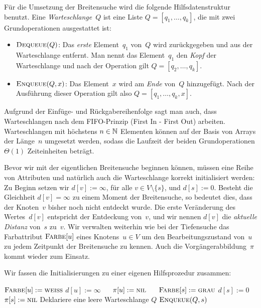 \begin{defn} 
Für die Umsetzung der Breitensuche wird die folgende Hilfsdatenstruktur benutzt.
Eine \emph{Warteschlange}~$Q$ ist eine Liste $Q=[q_1,\ldots,q_k]$, die mit zwei Grundoperationen ausgestattet ist:
\begin{itemize}
 \item $\mathop{\text{\textsc{Dequeue}}}(Q)$: Das \emph{erste} Element~$q_1$ von~$Q$ wird zurückgegeben und aus der Warteschlange entfernt.
 Man nennt das Element~$q_1$ den \emph{Kopf} der Warteschlange und nach der Operation gilt $Q=[q_2,\ldots,q_k]$.

 \item $\mathop{\text{\textsc{Enqueue}}}(Q,x)$: Das Element~$x$ wird am \emph{Ende} von~$Q$ hinzugefügt.
 Nach der Ausführung dieser Operation gilt also $Q=[q_1,\ldots,q_k,x]$. 
\end{itemize}
\end{defn} 

\begin{bem}
Aufgrund der Einfüge- und Rückgabereihenfolge sagt man auch, dass Warteschlangen nach dem FIFO-Prinzip (First In - First Out) arbeiten.
Warteschlangen mit höchstens $n \in \mathbb{N}$ Elementen können auf der Basis von Arrays der Länge~$n$ umgesetzt werden, sodass die Laufzeit der beiden Grundoperationen $\Theta(1)$ Zeiteinheiten beträgt. 
\end{bem} 

\begin{bem} 
Bevor wir mit der eigentlichen Breitensuche beginnen können, müssen eine Reihe von Attributen und natürlich auch die Warteschlange korrekt initialisiert werden:
Zu Beginn setzen wir $d[v]:=\infty$, für alle $v \in V \setminus \{s\}$, und $d[s]:=0$.
Besteht die Gleichheit $d[v]=\infty$ zu einem Moment der Breitensuche, so bedeutet dies, dass der Knoten~$v$ bisher noch nicht entdeckt wurde.
Die erste Veränderung des Wertes~$d[v]$ entspricht der Entdeckung von~$v$, und wir nennen $d[v]$ die \emph{aktuelle Distanz} von~$s$ zu~$v$. 
Wir verwalten weiterhin wie bei der Tiefensuche das Farbattribut $\mathop{\text{\textsc{Farbe}}}[u]$ eines Knotens~$u \in V$ um den Bearbeitungszustand von~$u$ zu jedem Zeitpunkt der Breitensuche zu kennen.
Auch die Vorgängerabbildung~$\pi$ kommt wieder zum Einsatz.
\end{bem} 

\begin{bem} 
Wir fassen die Initialisierungen zu einer eigenen Hilfsprozedur zusammen:

\begin{algorithm}[H]
\caption{$\cc{Breitensuche-initialisieren}(D,s)$}
\begin{algorithmic}[1]
  \STATE $\mathop{\text{\textsc{Farbe}}}[u] := \mathop{\text{\textsc{weiss}}}$
  \STATE $d[u] := \infty$ $\quad$ 
  \STATE $\pi[u] := \mathop{\text{\textsc{nil}}}$ $\quad$ 
 \ENDFOR
 \STATE $\mathop{\text{\textsc{Farbe}}}[s] := \mathop{\text{\textsc{grau}}}$
 \STATE $d[s] := 0$
 \STATE $\pi[s] := \mathop{\text{\textsc{nil}}}$
 \STATE Deklariere eine leere Warteschlange $Q$
 \STATE $\mathop{\text{\textsc{Enqueue}}}(Q,s)$
\end{algorithmic}
\end{algorithm}
\end{bem}

